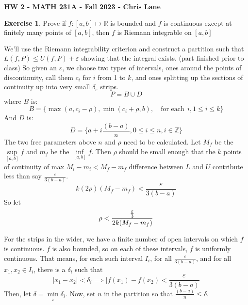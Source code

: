 \documentclass[11pt,oneside]{article}
\numberwithin{equation}{section}
\theoremstyle{definition}
\newtheorem{exercise}{Exercise}
\def\RR{\mathbb{R}}
\def\ZZ{\mathbb{Z}}
\begin{document}
\textbf{HW 2 - MATH 231A - Fall 2023 - Chris Lane}
\begin{exercise}
  Prove if $f:[a, b] \mapsto \RR $ is bounded and $f$ is continuous
  except at finitely many points of $[a,b]$, then $f$ is Riemann integrable on $[a,b ]$
\end{exercise}
\begin{solution}
  We'll use the Riemann integrability criterion and construct a
  partition such that $L(f, P) \leq U(f, P) + \varepsilon$ showing that
  the integral exists.  (part finished prior to class) So given an $\varepsilon$, we
  choose two types of intervals, ones around the points of
  discontinuity, call them $c_i$ for $i$ from 1 to $k$, and ones
  splitting up the sections of continuity up into very
  small $\delta_{\varepsilon}$ strips.
  $$
  P = B \cup D
  $$
  where $B$ is:
  $$
  B = \{ \max(a, c_i - \rho), \min(c_i + \rho, b), \quad \text{for each} \ \  i, 1 \leq i \leq k \}
  $$
  And $D$ is:
  $$
  D = \{ a + i \frac{(b - a)}{n}, 0 \leq i \leq n, i \in \ZZ \}
  $$
  The two free parameters above $n$ and $\rho$ need to be calculated.  Let $M_f$ be the
  $ \sup \limits_{[a,b]} f$ and $m_f$ be the $ \inf \limits_{[a,b]} f$.  Then $\rho$ should be
    small enough that the $k$ points of continuity of max $M_i - m_i < M_f - m_f$ difference between
    $L$ and $U$ contribute less than say $\frac{\varepsilon}{3(b-a)}$.
    $$ k (2 \rho) (M_f - m_f) < \frac{\varepsilon}{3(b-a)} $$
    So let 
    $$
    \rho < {\frac{\varepsilon}{3} \over 2k (M_f - m_f)}
    $$
    
    For the strips in the wider, we have a finite number of open intervals on which $f$ is continuous.  $f$ is also
    bounded, so on each of these intervals, $f$ is uniformly continuous.  That means, for each such interval $I_i$, for
    all $\frac{\varepsilon}{3(b-a)}$, and for all $x_1, x_2 \in I_i$, there is a $\delta_i$ such that
    $$
    | x_1 - x_2 | < \delta_i \implies | f(x_1) - f(x_2) < \frac{\varepsilon}{3(b-a)}
    $$
    Then, let $\delta = \min \limits_i \delta_i$.  Now, set $n$ in the partition so that $\frac{(b-a)}{n} \leq \delta$.


\end{solution}
\end{document}
